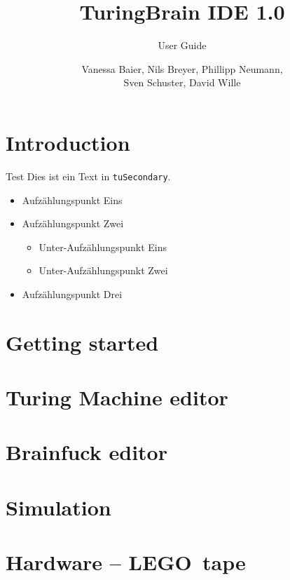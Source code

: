 \documentclass[%
  a4paper,%
  11pt,%
  style=screen,
  blue,%
  ]{tubsartcl}
\title{TuringBrain IDE \LARGE 1.0}
\subtitle{User Guide}
\author{\small Vanessa Baier, Nils Breyer, Phillipp Neumann,\\ Sven Schuster, David Wille}
\begin{document}
\maketitle[image,logo=right]%
\makebackpage[trisec]%

\tableofcontents
\newpage
\section{Introduction}

Test \textcolor{tuSecondary}{Dies ist ein Text in \texttt{tuSecondary}.}\bigskip


\begin{itemize}
  \item Aufzählungspunkt Eins
  \item Aufzählungspunkt Zwei
    \begin{itemize}
      \item Unter-Aufzählungspunkt Eins
      \item Unter-Aufzählungspunkt Zwei
    \end{itemize}
  \item Aufzählungspunkt Drei
\end{itemize}

\section{Getting started}


\section{Turing Machine editor}


\section{Brainfuck editor}


\section{Simulation}

\section{Hardware -- LEGO\textregistered\, tape}
\end{document}
